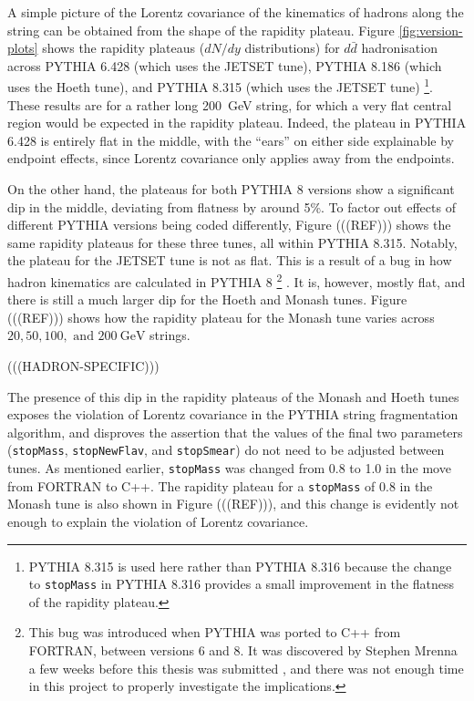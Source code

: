 \documentclass[12pt,a4paper]{report}
\begin{document}
A simple picture of the Lorentz covariance of the kinematics of hadrons along the string can be obtained from the shape of the rapidity plateau. Figure \ref{fig:version-plots} shows the rapidity plateaus ($dN/dy$ distributions) for $d\bar{d}$ hadronisation across PYTHIA 6.428 (which uses the JETSET tune), PYTHIA 8.186 (which uses the Hoeth tune), and PYTHIA 8.315 (which uses the JETSET tune) \footnote{PYTHIA 8.315 is used here rather than PYTHIA 8.316 because the change to \texttt{stopMass} in PYTHIA 8.316 provides a small improvement in the flatness of the rapidity plateau.}. These results are for a rather long \qty{200}{\giga\electronvolt} string, for which a very flat central region would be expected in the rapidity plateau. Indeed, the plateau in PYTHIA 6.428 is entirely flat in the middle, with the ``ears'' on either side explainable by endpoint effects, since Lorentz covariance only applies away from the endpoints.

On the other hand, the plateaus for both PYTHIA 8 versions show a significant dip in the middle, deviating from flatness by around 5\%. To factor out effects of different PYTHIA versions being coded differently, Figure (((REF))) shows the same rapidity plateaus for these three tunes, all within PYTHIA 8.315. Notably, the plateau for the JETSET tune is not as flat. This is a result of a bug in how hadron kinematics are calculated in PYTHIA 8 \footnote{This bug was introduced when PYTHIA was ported to C++ from FORTRAN, between versions 6 and 8. It was discovered by Stephen Mrenna a few weeks before this thesis was submitted \cite{steve}, and there was not enough time in this project to properly investigate the implications.} \cite{steve}. It is, however, mostly flat, and there is still a much larger dip for the Hoeth and Monash tunes. Figure (((REF))) shows how the rapidity plateau for the Monash tune varies across $20, 50, 100,\text{ and } \qty{200}{\giga\electronvolt}$ strings.

(((HADRON-SPECIFIC)))

The presence of this dip in the rapidity plateaus of the Monash and Hoeth tunes exposes the violation of Lorentz covariance in the PYTHIA string fragmentation algorithm, and disproves the assertion that the values of the final two parameters (\texttt{stopMass}, \texttt{stopNewFlav}, and \texttt{stopSmear}) do not need to be adjusted between tunes. As mentioned earlier, \texttt{stopMass} was changed from 0.8 to 1.0 in the move from FORTRAN to C++. The rapidity plateau for a \texttt{stopMass} of 0.8 in the Monash tune is also shown in Figure (((REF))), and this change is evidently not enough to explain the violation of Lorentz covariance.
\end{document}
